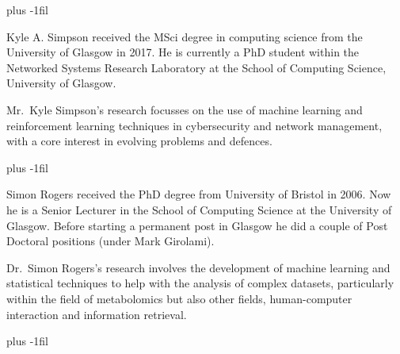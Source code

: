 \documentclass[10pt, times, comsoc]{IEEEtran}
\begin{document}
\renewcommand*{\bibfont}{\footnotesize}
\printbibliography
\vspace{-0.5cm}
\vskip 0pt plus -1fil
\begin{IEEEbiography}
	{Kyle A. Simpson}
	received the MSci degree in computing science from the University of Glasgow in 2017.
	He is currently a PhD student within the Networked Systems Research Laboratory at the School of Computing Science, University of Glasgow.
	
	Mr.\ Kyle Simpson's research focusses on the use of machine learning and reinforcement learning techniques in cybersecurity and network management, with a core interest in evolving problems and defences.
\end{IEEEbiography}
\vspace{-0.5cm}
\vskip 0pt plus -1fil
\begin{IEEEbiography}
	{Simon Rogers}
	received the PhD degree from University of Bristol in 2006. Now he is a Senior Lecturer in the School of Computing Science at the University of Glasgow. Before starting a permanent  post in Glasgow he did a couple of Post Doctoral positions (under Mark Girolami).
	
	Dr.\ Simon Rogers’s research involves the development of machine learning and statistical techniques to help with the analysis of complex datasets, particularly within the field of metabolomics but also other fields, human-computer interaction and information retrieval.
\end{IEEEbiography}
\vspace{-0.5cm}
\vskip 0pt plus -1fil
\end{document}
